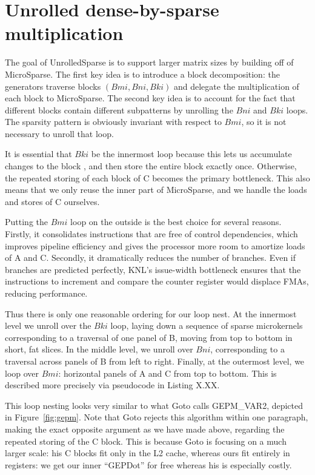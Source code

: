 \section{Unrolled dense-by-sparse multiplication}


The goal of UnrolledSparse is to support larger matrix sizes by building off of MicroSparse. The first key idea is to introduce a block decomposition: the generators traverse blocks $(Bmi, Bni, Bki)$ and delegate the multiplication of each block to MicroSparse. The second key idea is to account for the fact that different blocks contain different subpatterns by unrolling the $Bni$ and $Bki$ loops. The sparsity pattern is obviously invariant with respect to $Bmi$, so it is not necessary to unroll that loop. 

It is essential that $Bki$ be the innermost loop because this lets us accumulate changes to the block , and then store the entire block exactly once. Otherwise, the repeated storing of each block of C becomes the primary bottleneck. This also means that we only reuse the inner part of MicroSparse, and we handle the loads and stores of C ourselves.

Putting the $Bmi$ loop on the outside is the best choice for several reasons. Firstly, it consolidates instructions that are free of control dependencies, which improves pipeline efficiency and gives the processor more room to amortize loads of A and C. Secondly, it dramatically reduces the number of branches. Even if branches are predicted perfectly, KNL's issue-width bottleneck ensures that the instructions to increment and compare the counter register would displace FMAs, reducing performance.

Thus there is only one reasonable ordering for our loop nest. At the innermost level we unroll over the $Bki$ loop, laying down a sequence of sparse microkernels corresponding to a traversal of one panel of B, moving from top to bottom in short, fat slices. In the middle level, we unroll over $Bni$, corresponding to a traversal across panels of B from left to right. Finally, at the outermost level, we loop over $Bmi$: horizontal panels of A and C from top to bottom. This is described more precisely via pseudocode in Listing X.XX.

This loop nesting looks very similar to what Goto calls GEPM\_VAR2, depicted in Figure~\ref{fig:gepm}. Note that Goto rejects this algorithm within one paragraph, making the exact opposite argument as we have made above, regarding the repeated storing of the C block. This is because Goto is focusing on a much larger scale: his C blocks fit only in the L2 cache, whereas ours fit entirely in registers: we get our inner ``GEPDot'' for free whereas his is especially costly.


